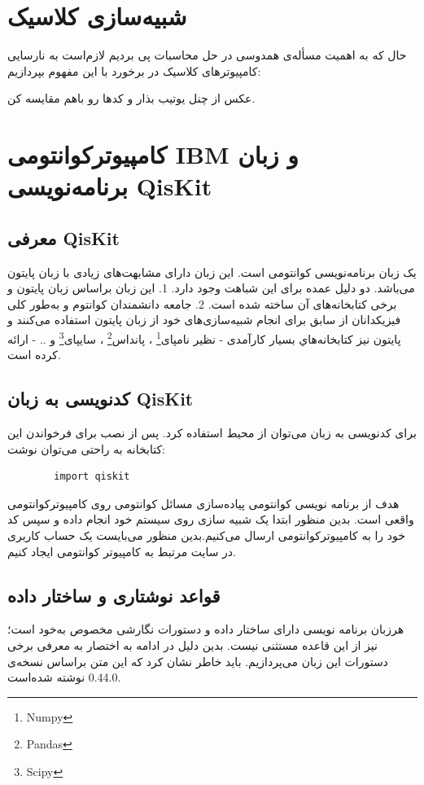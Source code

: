 \documentclass{book}
\begin{document}
\section{شبیه‌سازی کلاسیک}
حال که به اهمیت مسأله‌ی همدوسی در حل محاسبات پی بردیم لازم‌است به نارسایی کامپیوتر‌های کلاسیک در برخورد با این مفهوم بپردازیم:

عکس از چنل یوتیب بذار و کدها رو باهم مقایسه کن.


\newpage
\section{کامپیوترکوانتومی IBM و زبان برنامه‌نویسی QisKit}

\subsection{معرفی QisKit}
یک زبان برنامه‌نویسی کوانتومی است. این زبان دارای مشابهت‌های زیادی با زبان پایتون می‌باشد. دو دلیل عمده برای این شباهت وجود دارد. 1. این زبان براساس زبان پایتون و برخی کتابخانه‌های آن ساخته شده است. 2. جامعه دانشمندان کوانتوم و به‌طور کلی فیزیکدانان از سابق برای انجام شبیه‌سازی‌های خود از زبان پایتون استفاده می‌کنند و پایتون نیز کتابخانه‌هاي بسیار کارآمدی - نظیر نامپای\footnote{Numpy} ، پانداس\footnote{Pandas} ، سایپای\footnote{Scipy} و .. - ارائه کرده است.

\subsection{کدنویسی به زبان QisKit}
برای کدنویسی به زبان  می‌توان از محیط  استفاده کرد. پس از نصب  برای فرخواندن این کتابخانه به راحتی می‌توان نوشت:

\begin{latin}
	\begin{verbatim}
		import qiskit
	\end{verbatim}
\end{latin}

هدف از برنامه نویسی کوانتومی پیاده‌سازی مسائل کوانتومی روی کامپیوتر‌کوانتومی‌ واقعی است. بدین منظور ابتدا یک شبیه سازی روی سیستم خود انجام داده و سپس کد خود را به کامپیوتر‌کوانتومی  ارسال می‌کنیم.بدین منظور می‌بایست یک حساب کاربری در سایت مرتبط به کامپیوتر کوانتومی  ایجاد کنیم.


\subsection{قواعد نوشتاری و ساختار داده}
هرزبان برنامه نویسی دارای ساختار داده و دستورات نگارشی مخصوص به‌خود است؛  نیز از این قاعده مستثنی نیست. بدین دلیل در ادامه به اختصار به معرفی برخی دستورات این زبان می‌پردازیم. باید خاطر نشان کرد که این متن براساس  نسخه‌ی  0.44.0 نوشته‌ شده‌است.
\end{document}
